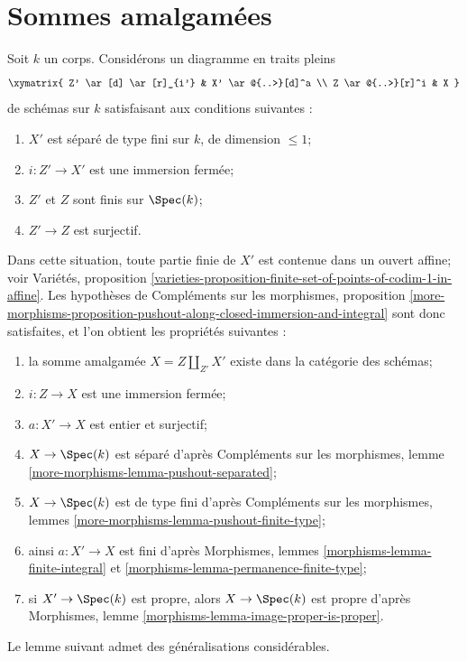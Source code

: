 \section{Sommes amalgamées}
\label{section-pushouts}

\noindent
Soit $k$ un corps. Considérons un diagramme en traits pleins $$
\xymatrix{
Z' \ar[d] \ar[r]_{i'} & X' \ar@{..>}[d]^a \\
Z \ar@{..>}[r]^i & X
}
$$ de schémas sur $k$ satisfaisant aux conditions suivantes : \begin{enumerate} \item[(a)] $X'$ est séparé de type fini sur $k$, de dimension $\leq 1$; \item[(b)] $i : Z' \to X'$ est une immersion fermée; \item[(c)] $Z'$ et $Z$ sont finis sur $\Spec(k)$; \item[(d)] $Z' \to Z$ est surjectif. \end{enumerate} Dans cette situation, toute partie finie de $X'$ est contenue dans un ouvert affine; voir Variétés, proposition \ref{varieties-proposition-finite-set-of-points-of-codim-1-in-affine}. Les hypothèses de Compléments sur les morphismes, proposition \ref{more-morphisms-proposition-pushout-along-closed-immersion-and-integral} sont donc satisfaites, et l'on obtient les propriétés suivantes : \begin{enumerate} \item la somme amalgamée $X = Z \amalg_{Z'} X'$ existe dans la catégorie des schémas; \item $i : Z \to X$ est une immersion fermée; \item $a : X' \to X$ est entier et surjectif; \item $X \to \Spec(k)$ est séparé d'après Compléments sur les morphismes, lemme \ref{more-morphisms-lemma-pushout-separated}; \item $X \to \Spec(k)$ est de type fini d'après Compléments sur les morphismes, lemmes \ref{more-morphisms-lemma-pushout-finite-type}; \item ainsi $a : X' \to X$ est fini d'après Morphismes, lemmes \ref{morphisms-lemma-finite-integral} et \ref{morphisms-lemma-permanence-finite-type}; \item si $X' \to \Spec(k)$ est propre, alors $X \to \Spec(k)$ est propre d'après Morphismes, lemme \ref{morphisms-lemma-image-proper-is-proper}.
\end{enumerate}

\noindent
Le lemme suivant admet des généralisations considérables.

